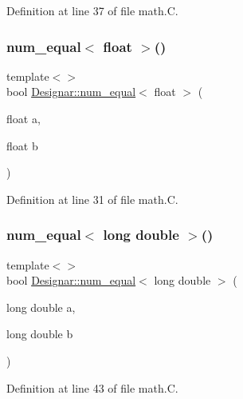Definition at line 37 of file math.\+C.

\mbox{\label{namespace_designar_a29878d27cf434c0bac7093ec7b4d8613}} 
\subsubsection{\texorpdfstring{num\+\_\+equal$<$ float $>$()}{num\_equal< float >()}}
{\footnotesize\ttfamily template$<$$>$ \\
bool \hyperlink{namespace_designar_ad193c81ed087e63575903c6775df36b2}{Designar\+::num\+\_\+equal}$<$ float $>$ (\begin{DoxyParamCaption}\item[{float}]{a,  }\item[{float}]{b }\end{DoxyParamCaption})}



Definition at line 31 of file math.\+C.

\mbox{\label{namespace_designar_a161c5a6c7e958d708e5898265c9a37f7}} 
\subsubsection{\texorpdfstring{num\+\_\+equal$<$ long double $>$()}{num\_equal< long double >()}}
{\footnotesize\ttfamily template$<$$>$ \\
bool \hyperlink{namespace_designar_ad193c81ed087e63575903c6775df36b2}{Designar\+::num\+\_\+equal}$<$ long double $>$ (\begin{DoxyParamCaption}\item[{long double}]{a,  }\item[{long double}]{b }\end{DoxyParamCaption})}



Definition at line 43 of file math.\+C.

\mbox{\label{namespace_designar_a4b2db2e125d6ac9edf439f63804ba674}} 
